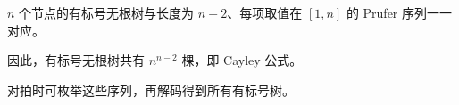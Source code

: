 $n$ 个节点的有标号无根树与长度为 $n-2$、每项取值在 $[1,n]$ 的 Prufer 序列一一对应。

因此，有标号无根树共有 $n^{n-2}$ 棵，即 Cayley 公式。

对拍时可枚举这些序列，再解码得到所有有标号树。
